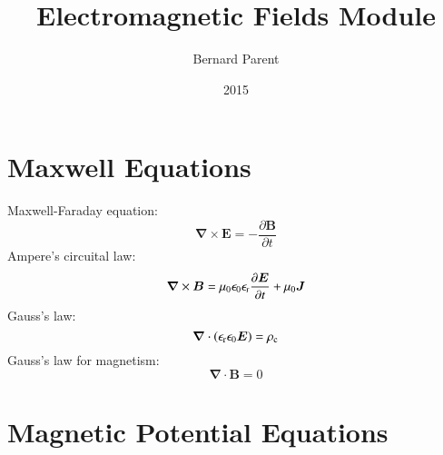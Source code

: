 \documentclass{warpdoc}
\author{
  Bernard Parent
}
\title{
  Electromagnetic Fields Module  
}
\date{
  2015
}
\renewcommand{\vec}[1]{\bm{#1}}
\begin{document}
  \pagestyle{headings}
  \setcounter{page}{1}
  \makewarpdoctitle
  \tableofcontents



\section{Maxwell Equations}


Maxwell-Faraday equation:
%
\begin{equation}
\vec{\nabla} \times \vec{E} = -\frac{\partial \vec{B}}{\partial t}
\end{equation}
%
Ampere's circuital law:
%
\begin{equation}
\vec{\nabla} \times \vec{B} = \mu_0 \epsilon_0 \epsilon_{\rm r} \frac{\partial \vec{E}}{\partial t} + \mu_0 \vec{J}
\end{equation}
%
Gauss's law:
%
\begin{equation}
\vec{\nabla} \cdot \left( \epsilon_{\rm r} \epsilon_0 \vec{E} \right) = \rho_{\rm c}
\end{equation}
%
Gauss's law for magnetism:
%
\begin{equation}
\vec{\nabla} \cdot \vec{B} = 0
\end{equation}
%


\section{Magnetic Potential Equations}
\end{document}
